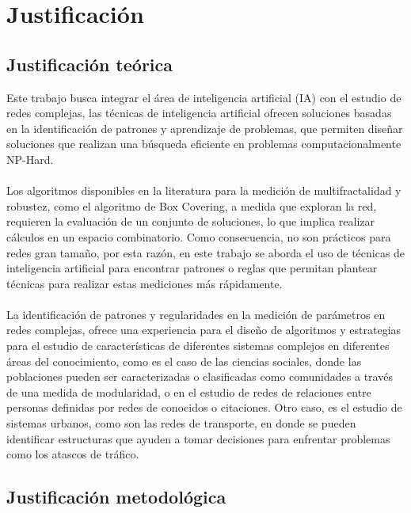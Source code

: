 \section{Justificación}

\subsection{Justificación teórica}

Este trabajo busca integrar el área de inteligencia artificial (IA) con el estudio de redes
complejas, las técnicas de inteligencia artificial ofrecen soluciones basadas en la identificación
de patrones y aprendizaje de problemas, que permiten diseñar soluciones que realizan una
búsqueda eficiente en problemas computacionalmente NP-Hard.
\\\\
Los algoritmos disponibles en la literatura para la medición de multifractalidad y robustez,
como el algoritmo de Box Covering, a medida que exploran la red, requieren la evaluación
de un conjunto de soluciones, lo que implica realizar cálculos en un espacio combinatorio.
Como consecuencia, no son prácticos para redes gran tamaño, por esta razón, en este trabajo
se aborda el uso de técnicas de inteligencia artificial para encontrar patrones o reglas que
permitan plantear técnicas para realizar estas mediciones más rápidamente.
\\\\
La identificación de patrones y regularidades en la medición de parámetros en redes complejas, ofrece una experiencia para el diseño de algoritmos y estrategias para el estudio de
características de diferentes sistemas complejos en diferentes áreas del conocimiento, como es
el caso de las ciencias sociales, donde las poblaciones pueden ser caracterizadas o clasificadas
como comunidades a través de una medida de modularidad, o en el estudio de redes de relaciones entre personas definidas por redes de conocidos o citaciones. Otro caso, es el estudio de
sistemas urbanos, como son las redes de transporte, en donde se pueden identificar estructuras
que ayuden a tomar decisiones para enfrentar problemas como los atascos de tráfico.

\subsection{Justificación metodológica}




